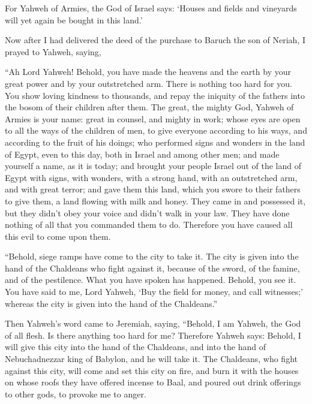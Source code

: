 {For Yahweh of Armies, the God of Israel says: ‘Houses and fields and vineyards will yet again be bought in this land.’
\par }{\PP {}Now after I had delivered the deed of the purchase to Baruch the son of Neriah, I prayed to Yahweh, saying,
\par }{\BB \par }{\MI {}“Ah Lord Yahweh! Behold, you have made the heavens and the earth by your great power and by your outstretched arm. There is nothing too hard for you.
You show loving kindness to thousands, and repay the iniquity of the fathers into the bosom of their children after them. The great, the mighty God, Yahweh of Armies is your name:
great in counsel, and mighty in work; whose eyes are open to all the ways of the children of men, to give everyone according to his ways, and according to the fruit of his doings;
who performed signs and wonders in the land of Egypt, even to this day, both in Israel and among other men; and made yourself a name, as it is today;
and brought your people Israel out of the land of Egypt with signs, with wonders, with a strong hand, with an outstretched arm, and with great terror;
and gave them this land, which you swore to their fathers to give them, a land flowing with milk and honey.
They came in and possessed it, but they didn’t obey your voice and didn’t walk in your law. They have done nothing of all that you commanded them to do. Therefore you have caused all this evil to come upon them.
\par }{\PI {}“Behold, siege ramps have come to the city to take it. The city is given into the hand of the Chaldeans who fight against it, because of the sword, of the famine, and of the pestilence. What you have spoken has happened. Behold, you see it.
You have said to me, Lord Yahweh, ‘Buy the field for money, and call witnesses;’ whereas the city is given into the hand of the Chaldeans.”
\par }{\PP {}Then Yahweh’s word came to Jeremiah, saying,
“Behold, I am Yahweh, the God of all flesh. Is there anything too hard for me?
Therefore Yahweh says: Behold, I will give this city into the hand of the Chaldeans, and into the hand of Nebuchadnezzar king of Babylon, and he will take it.
The Chaldeans, who fight against this city, will come and set this city on fire, and burn it with the houses on whose roofs they have offered incense to Baal, and poured out drink offerings to other gods, to provoke me to anger.
}
